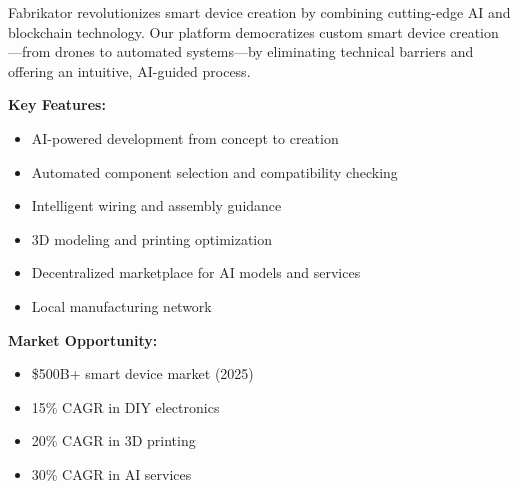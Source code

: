 \vspace{0.5cm}
\noindent Fabrikator revolutionizes smart device creation by combining cutting-edge AI and blockchain technology. Our platform democratizes custom smart device creation—from drones to automated systems—by eliminating technical barriers and offering an intuitive, AI-guided process.

\vspace{0.5cm}
\noindent\textbf{Key Features:}
\begin{itemize}[leftmargin=*]
    \item AI-powered development from concept to creation
    \item Automated component selection and compatibility checking
    \item Intelligent wiring and assembly guidance
    \item 3D modeling and printing optimization
    \item Decentralized marketplace for AI models and services
    \item Local manufacturing network
\end{itemize}

\vspace{0.5cm}
\noindent\textbf{Market Opportunity:}
\begin{itemize}[leftmargin=*]
    \item \$500B+ smart device market (2025)
    \item 15\% CAGR in DIY electronics
    \item 20\% CAGR in 3D printing
    \item 30\% CAGR in AI services
\end{itemize} 